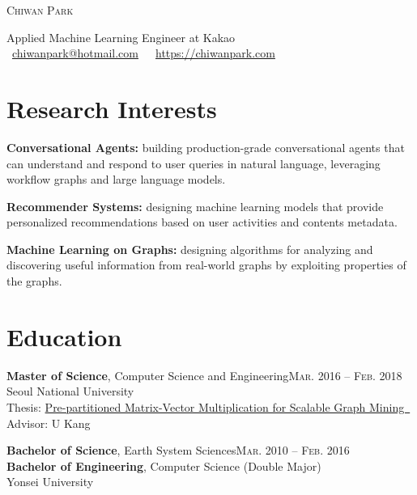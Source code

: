 \documentclass[11pt,a4paper]{article}
\makeatletter
\def\myname{Chiwan Park}
\def\myemail{chiwanpark@hotmail.com}
\def\myhomepage{https://chiwanpark.com}
\newenvironment{entry}{
  \begin{list}{}{
    \setlength{\leftmargin}{0em}
    \setlength{\itemsep}{0.25em}
    \setlength{\parskip}{0pt}
    \setlength{\parsep}{0.25em}
  }
}{
  \end{list}
}
\let\orighref\href
\renewcommand{\href}[2]{\orighref{#1}{#2\ {\scriptsize\faIcon{external-link-alt}}}}
\makeatother
\begin{document}
\begin{minipage}[t]{0.375\textwidth}
    \vspace{0pt}
    \Huge
    \textsc{\myname}
\end{minipage}
\hfill
\begin{minipage}[t]{0.6\textwidth}
  \vspace{0pt}
  Applied Machine Learning Engineer at Kakao\\
  {\scriptsize{}}\ \orighref{mailto:\myemail}{\myemail}\ \ {\scriptsize{}}\ \orighref{\myhomepage}{\myhomepage}
\end{minipage}

\section*{Research Interests}
\begin{entry}
  \item \textbf{Conversational Agents:} building production-grade conversational agents that can understand and respond to user queries in natural language, leveraging workflow graphs and large language models.
  \item \textbf{Recommender Systems:} designing machine learning models that provide personalized recommendations based on user activities and contents metadata.
  \item \textbf{Machine Learning on Graphs:} designing algorithms for analyzing and discovering useful information from real-world graphs by exploiting properties of the graphs.
\end{entry}

\section*{Education}
\begin{entry}
  \item \textbf{Master of Science}, Computer Science and Engineering\hfill\textsc{Mar. 2016 -- Feb. 2018}\\
        Seoul National University\\
        Thesis: \href{https://s-space.snu.ac.kr/bitstream/10371/141560/1/000000151119.pdf}{Pre-partitioned Matrix-Vector Multiplication for Scalable Graph Mining}\\
        Advisor: U Kang
  \item \textbf{Bachelor of Science}, Earth System Sciences\hfill\textsc{Mar. 2010 -- Feb. 2016}\\
        \textbf{Bachelor of Engineering}, Computer Science (Double Major)\\
        Yonsei University
\end{entry}
\end{document}
